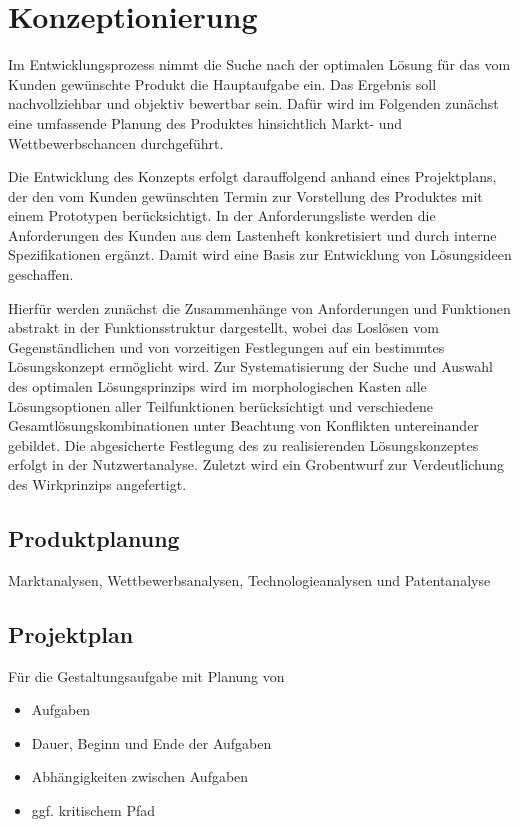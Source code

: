 
\chapter{Konzeptionierung}

Im Entwicklungsprozess nimmt die Suche nach der optimalen Lösung für das vom Kunden gewünschte Produkt die Hauptaufgabe ein. Das Ergebnis soll nachvollziehbar und objektiv bewertbar sein. Dafür wird im Folgenden zunächst eine umfassende Planung des Produktes hinsichtlich Markt- und Wettbewerbschancen durchgeführt.

Die Entwicklung des Konzepts erfolgt darauffolgend anhand eines Projektplans, der den vom Kunden gewünschten Termin zur Vorstellung des Produktes mit einem Prototypen berücksichtigt. In der Anforderungsliste werden die Anforderungen des Kunden aus dem Lastenheft konkretisiert und durch interne Spezifikationen ergänzt. Damit wird eine Basis zur Entwicklung von Lösungsideen geschaffen.

Hierfür werden zunächst die Zusammenhänge von Anforderungen und Funktionen abstrakt in der Funktionsstruktur dargestellt, wobei das Loslösen vom Gegenständlichen und von vorzeitigen Festlegungen auf ein bestimmtes Lösungskonzept ermöglicht wird. Zur Systematisierung der Suche und Auswahl des optimalen Lösungsprinzips wird im morphologischen Kasten alle Lösungsoptionen aller Teilfunktionen berücksichtigt und verschiedene Gesamtlösungskombinationen unter Beachtung von Konflikten untereinander gebildet. Die abgesicherte Festlegung des zu realisierenden Lösungskonzeptes erfolgt in der Nutzwertanalyse. Zuletzt wird ein Grobentwurf zur Verdeutlichung des Wirkprinzips angefertigt.

\section{Produktplanung}

Marktanalysen, Wettbewerbsanalysen, Technologieanalysen und Patentanalyse


\section{Projektplan}

Für die Gestaltungsaufgabe mit Planung von

\begin{itemize}
\item Aufgaben
\item Dauer, Beginn und Ende der Aufgaben
\item Abhängigkeiten zwischen Aufgaben
\item ggf. kritischem Pfad
\end{itemize}

